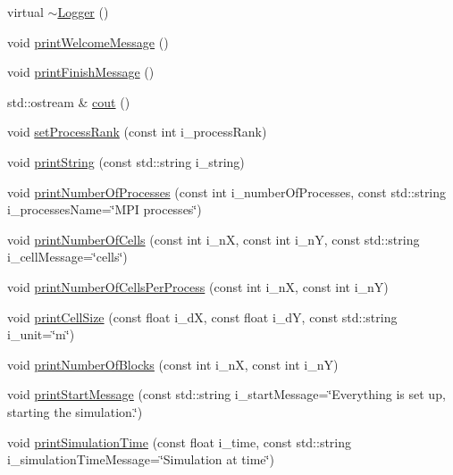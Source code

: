 \begin{DoxyCompactItemize}
\item 
virtual \hyperlink{classtools_1_1Logger_a58f170bf361ba7ceb3a4e0d9ec36bdf5}{$\sim$\-Logger} ()
\item 
void \hyperlink{classtools_1_1Logger_af45e7a1b4e9c33ab9fbb43e18e284eae}{print\-Welcome\-Message} ()
\item 
void \hyperlink{classtools_1_1Logger_a539d6f7c8e60c0ee887912c92c1dfa5c}{print\-Finish\-Message} ()
\item 
std\-::ostream \& \hyperlink{classtools_1_1Logger_ab0d82d23125a3d5d8b737984e678f43a}{cout} ()
\item 
void \hyperlink{classtools_1_1Logger_a1d3e0fcc3cb4c58eb486ac3fe14d30b0}{set\-Process\-Rank} (const int i\-\_\-process\-Rank)
\item 
void \hyperlink{classtools_1_1Logger_a9642689522ece27ca9c908f24f290134}{print\-String} (const std\-::string i\-\_\-string)
\item 
void \hyperlink{classtools_1_1Logger_a89b9dfd5340a4e18d7b8f1225d996730}{print\-Number\-Of\-Processes} (const int i\-\_\-number\-Of\-Processes, const std\-::string i\-\_\-processes\-Name=\char`\"{}M\-P\-I processes\char`\"{})
\item 
void \hyperlink{classtools_1_1Logger_a2da0a6c575304e91bea546dddc94f72d}{print\-Number\-Of\-Cells} (const int i\-\_\-n\-X, const int i\-\_\-n\-Y, const std\-::string i\-\_\-cell\-Message=\char`\"{}cells\char`\"{})
\item 
void \hyperlink{classtools_1_1Logger_acf2b4547c8b138e4e8e338002687a149}{print\-Number\-Of\-Cells\-Per\-Process} (const int i\-\_\-n\-X, const int i\-\_\-n\-Y)
\item 
void \hyperlink{classtools_1_1Logger_a4c81063c055f072c465853d6da85743b}{print\-Cell\-Size} (const float i\-\_\-d\-X, const float i\-\_\-d\-Y, const std\-::string i\-\_\-unit=\char`\"{}m\char`\"{})
\item 
void \hyperlink{classtools_1_1Logger_a6c71eab182524a84037eb6fe1ac42e9e}{print\-Number\-Of\-Blocks} (const int i\-\_\-n\-X, const int i\-\_\-n\-Y)
\item 
void \hyperlink{classtools_1_1Logger_a2d54396c65885248374009cb3b18c2da}{print\-Start\-Message} (const std\-::string i\-\_\-start\-Message=\char`\"{}Everything is set up, starting the simulation.\char`\"{})
\item 
void \hyperlink{classtools_1_1Logger_ac829729cc06f2a6e43f0272ada747685}{print\-Simulation\-Time} (const float i\-\_\-time, const std\-::string i\-\_\-simulation\-Time\-Message=\char`\"{}Simulation at time\char`\"{})

\end{DoxyCompactItemize}
